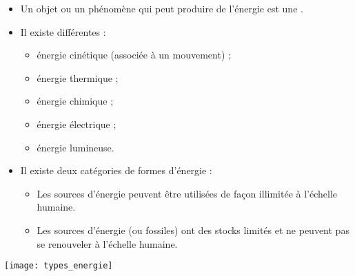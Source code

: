 \begin{mybilan}
	\begin{itemize}
		
		\item Un objet ou un phénomène qui peut produire de l'énergie est une .
				
		\item Il existe différentes  :
		
			\begin{itemize}
				\item énergie cinétique (associée à un mouvement) ;
				\item énergie thermique ;
				\item énergie chimique ;
				\item énergie électrique ;
				\item énergie lumineuse.
			\end{itemize}
		
		\item Il existe deux catégories de formes d'énergie :
			\begin{itemize}
				\item Les sources d'énergie  peuvent être utilisées de façon illimitée à l'échelle humaine.
				\item Les sources d'énergie  (ou fossiles) ont des stocks limités et ne peuvent pas se renouveler à l'échelle humaine.
			\end{itemize}
	\end{itemize}


	\begin{center}
		\texttt{[image: types\_energie]}
	\end{center}
\end{mybilan}